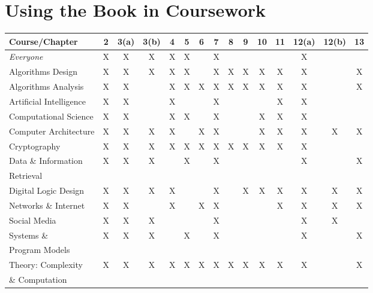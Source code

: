 \documentclass{article}
\begin{document}
\section*{Using the Book in Coursework}

\bigskip

\begin{tabular}{|l||c|c|c|c|c|c|c|c|c|c|c|c|c|c|}
\hline
{\bf Course}/{\bf Chapter}
   & 2 & 3(a) & 3(b) & 4 & 5 & 6 & 7 & 8 & 9 & 10 & 11 & 12(a) & 12(b) & 13 \\
\hline
\hline
{\em Everyone} 
   & X & X & X & X & X &  & X &  &  &  &  & X & &  \\
\hline
Algorithms Design
   & X & X & X & X & X &  & X & X & X & X & X & X & & X \\
\hline
Algorithms Analysis
   & X & X & & X & X & X & X & X & X & X & X & X & & X \\
   \hline
Artificial Intelligence
   & X & X & & X &  &  & X &  &  &  & X & X & &  \\
   \hline
Computational Science
   & X & X & & X & X &  & X &  &  & X & X & X &  &  \\
\hline
Computer Architecture 
   & X & X & X & X &  & X & X &  &  & X & X & X & X & X \\
\hline
Cryptography 
   & X & X & X & X & X & X & X & X & X & X & X & X & &  \\
\hline
Data \& Information 
   & X & X & X & & X &  & X &  &  &  &  & X & & X \\
Retrieval
    &  &  &  &  &  &  &  &  &  &  &  &  & & \\
\hline
Digital Logic Design 
   & X & X & X & X &  &  & X &  & X & X & X & X & X & X \\
\hline
Networks \& Internet
   & X & X & & X &  & X & X &  &  &  & X & X & X & X \\
\hline
Social Media 
   & X & X & X &  &  &  & X &  &  &  &  & X & X &  \\
\hline
Systems \&     
  & X & X & X &  & X &  & X &  &  &  &  & X & & X \\
Program Models &  & &  &  &  &  &  &  &  &  &  &  & & \\ 
\hline
Theory: Complexity 
   & X & X & X & X & X & X & X & X & X & X & X & X & & X \\
\& Computation    &  &  & &  &  &  &  &  &  &  &  &  & & \\
\hline
\end{tabular}
\bigskip
\end{document}
